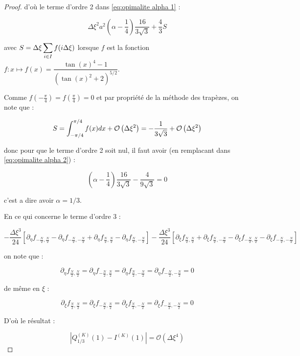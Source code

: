 \begin{proof}
d'où le terme d'ordre 2 dans \eqref{eq:opimalite alpha 1} :

\begin{equation}
\Delta \xi^2 a^2 \left( \alpha - \dfrac{1}{4} \right) \dfrac{16}{3 \sqrt{3}} + \dfrac{4}{3}S
\label{eq:opimalite alpha 2}
\end{equation}

avec $S=\Delta \xi \displaystyle\sum\limits_{i \in I} f(i \Delta \xi)$ lorsque $f$ est la fonction $f:x \mapsto f(x)=\dfrac{\tan(x)^4 -1}{(\tan(x)^2+2)^{5/2}}$.

Comme $f\left(-\frac{\pi}{4} \right)=f\left(\frac{\pi}{4} \right)=0$ et par propriété de la méthode des trapèzes, on note que :

\begin{equation}
S = \displaystyle\int_{-\pi/4}^{\pi/4} f(x)dx + \mathcal{O}\left( \Delta \xi^2 \right) = -\dfrac{1}{3\sqrt{3}} + \mathcal{O}\left( \Delta \xi^2 \right)
\end{equation}

donc pour que le terme d'ordre 2 soit nul, il faut avoir (en remplacant dans  \eqref{eq:opimalite alpha 2}) :

\begin{equation}
\left(\alpha - \dfrac{1}{4} \right) \dfrac{16}{3 \sqrt{3}} - \dfrac{4}{9 \sqrt{3}} = 0
\end{equation}

c'est a dire avoir $\alpha = 1/3$.

En ce qui concerne le terme d'ordre 3 :

\begin{equation}
- \dfrac{\Delta \xi^3}{24} \left[ \partial_{\eta} f_{-\frac{N}{2},\frac{N}{2}} - \partial_{\eta} f_{-\frac{N}{2},-\frac{N}{2}} + \partial_{\eta} f_{\frac{N}{2},\frac{N}{2}} -\partial_{\eta} f_{\frac{N}{2},-\frac{N}{2}}  \right] -\dfrac{\Delta \xi^3}{24} \left[ \partial_{\xi} f_{\frac{N}{2},\frac{N}{2}} + \partial_{\xi} f_{\frac{N}{2},-\frac{N}{2}} - \partial_{\xi} f_{-\frac{N}{2},\frac{N}{2}} -\partial_{\xi} f_{-\frac{N}{2},-\frac{N}{2}}  \right]
\label{eq:opimalite alpha 3}
\end{equation}

on note que :

\begin{equation}
\partial_{\eta} f_{\frac{N}{2},\frac{N}{2}} = \partial_{\eta} f_{-\frac{N}{2},\frac{N}{2}} = \partial_{\eta} f_{\frac{N}{2},-\frac{N}{2}} = \partial_{\eta} f_{-\frac{N}{2},-\frac{N}{2}} = 0 
\end{equation}

de même en $\xi$ :

\begin{equation}
\partial_{\xi} f_{\frac{N}{2},\frac{N}{2}} = \partial_{\xi} f_{-\frac{N}{2},\frac{N}{2}} = \partial_{\xi} f_{\frac{N}{2},-\frac{N}{2}} = \partial_{\xi} f_{-\frac{N}{2},-\frac{N}{2}} = 0 
\end{equation}

D'où le résultat :

\begin{equation}
|Q_{1/3}^{(K)}(1) - I^{(K)}(1) | = \mathcal{O}\left( \Delta \xi^4 \right)
\end{equation}

\end{proof}

